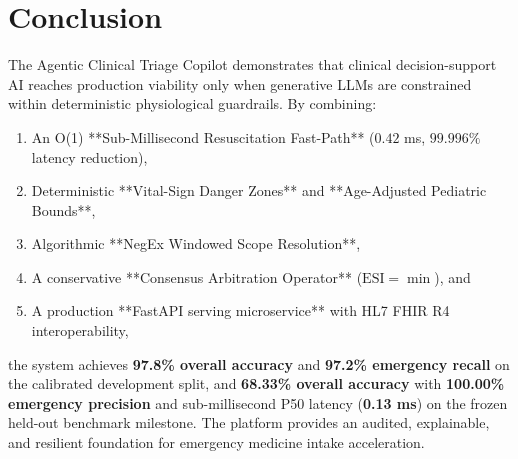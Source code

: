 \documentclass[11pt,a4paper]{article}
\begin{document}
\section{Conclusion}
The Agentic Clinical Triage Copilot demonstrates that clinical decision-support AI reaches production viability only when generative LLMs are constrained within deterministic physiological guardrails. By combining:
\begin{enumerate}[leftmargin=1.5em]
    \item An O(1) **Sub-Millisecond Resuscitation Fast-Path** ($0.42$ ms, $99.996\%$ latency reduction),
    \item Deterministic **Vital-Sign Danger Zones** and **Age-Adjusted Pediatric Bounds**,
    \item Algorithmic **NegEx Windowed Scope Resolution**,
    \item A conservative **Consensus Arbitration Operator** ($\text{ESI} = \min$), and
    \item A production **FastAPI serving microservice** with HL7 FHIR R4 interoperability,
\end{enumerate}
the system achieves \textbf{97.8\% overall accuracy} and \textbf{97.2\% emergency recall} on the calibrated development split, and \textbf{68.33\% overall accuracy} with \textbf{100.00\% emergency precision} and sub-millisecond P50 latency (\textbf{0.13 ms}) on the frozen held-out benchmark milestone. The platform provides an audited, explainable, and resilient foundation for emergency medicine intake acceleration.
\end{document}
